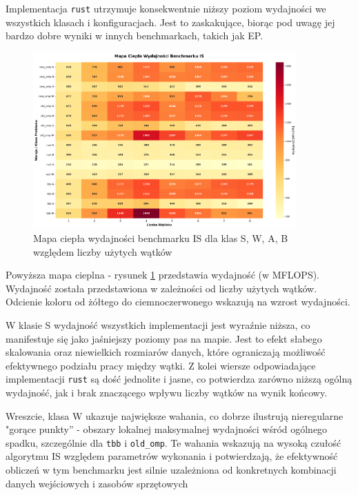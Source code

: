 Implementacja \texttt{rust} utrzymuje konsekwentnie niższy poziom wydajności we wszystkich klasach i konfiguracjach. Jest to zaskakujące, biorąc pod uwagę jej bardzo dobre wyniki w innych benchmarkach, takich jak EP.
\begin{figure}[H]
    \centering
    \includegraphics[width=0.9\textwidth]{analiza/images/parallel/is/arm/is_mapa_ciepla_wydajnosci.png}
    \caption{Mapa ciepła wydajności benchmarku IS dla klas S, W, A, B względem liczby użytych wątków}
    \label{is_heatmap_wydajnosci}
\end{figure}
Powyższa mapa cieplna - rysunek \ref{is_heatmap_wydajnosci} przedstawia wydajność (w MFLOPS). Wydajność została przedstawiona w zależności od liczby użytych wątków. Odcienie koloru od żółtego do ciemnoczerwonego wskazują na wzrost wydajności.

W klasie S wydajność wszystkich implementacji jest wyraźnie niższa, co manifestuje się jako jaśniejszy poziomy pas na mapie. Jest to efekt słabego skalowania oraz niewielkich rozmiarów danych, które ograniczają możliwość efektywnego podziału pracy między wątki. Z kolei wiersze odpowiadające implementacji \texttt{rust} są dość jednolite i jasne, co potwierdza zarówno niższą ogólną wydajność, jak i brak znaczącego wpływu liczby wątków na wynik końcowy.

Wreszcie, klasa W ukazuje największe wahania, co dobrze ilustrują nieregularne "gorące punkty” - obszary lokalnej maksymalnej wydajności wśród ogólnego spadku, szczególnie dla \texttt{tbb} i \texttt{old\_omp}. Te wahania wskazują na wysoką czułość algorytmu IS względem parametrów wykonania i potwierdzają, że efektywność obliczeń w tym benchmarku jest silnie uzależniona od konkretnych kombinacji danych wejściowych i zasobów sprzętowych


